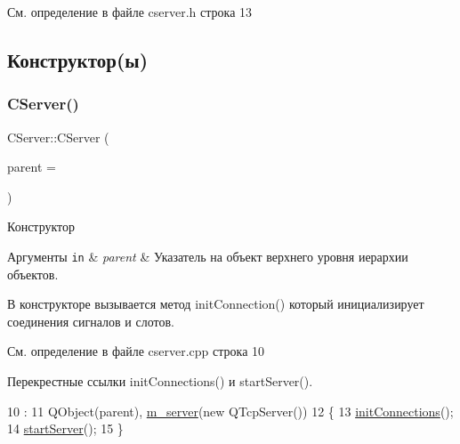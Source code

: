 См. определение в файле cserver.\+h строка 13



\subsection{Конструктор(ы)}
\hypertarget{class_c_server_a743d64a8f7c949de3de873735f726fcf}{}\label{class_c_server_a743d64a8f7c949de3de873735f726fcf} 
\subsubsection{\texorpdfstring{C\+Server()}{CServer()}}
{\footnotesize\ttfamily C\+Server\+::\+C\+Server (\begin{DoxyParamCaption}\item[{Q\+Object $\ast$}]{parent = {} }\end{DoxyParamCaption})\hspace{0.3cm}{\ttfamily [explicit]}}



Конструктор 


\begin{DoxyParams}[1]{Аргументы}
\mbox{\tt in}  & {\em parent} & Указатель на объект верхнего уровня иерархии объектов.\\
\hline
\end{DoxyParams}
В конструкторе вызывается метод init\+Connection() который инициализирует соединения сигналов и слотов. 

См. определение в файле cserver.\+cpp строка 10



Перекрестные ссылки init\+Connections() и start\+Server().


\begin{DoxyCode}
10                                 :
11     QObject(parent), \hyperlink{class_c_server_a0ee5b734ddfc86fc181e767700f7a46b}{m\_server}(\textcolor{keyword}{new} QTcpServer())
12 \{
13     \hyperlink{class_c_server_a32c8f33336a76b36c2653553b970e76c}{initConnections}();
14     \hyperlink{class_c_server_adbc93cef317eac86a09a0b7067c96cc1}{startServer}();
15 \}
\end{DoxyCode}
\hypertarget{class_c_server_af6da9f8b52bdc049e21cd7c687ef4d4b}{}\label{class_c_server_af6da9f8b52bdc049e21cd7c687ef4d4b} 
